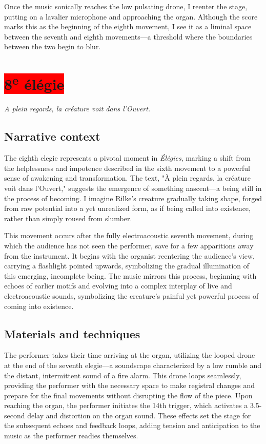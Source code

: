 \documentclass[12pt,twoside,maitrise]{dms_ks}
\theoremstyle{definition}
\begin{document}
{Once the music sonically reaches the low pulsating drone, I reenter the stage, putting on a lavalier microphone and approaching the organ. 
Although the score marks this as the beginning of the eighth movement, I see it as a liminal space between the seventh and eighth movements—a threshold where the boundaries between the two begin to blur.

\section{\colorbox{red}{8\textsuperscript{e} élégie}}

\epigraph{\textit{A plein regards, la créature voit dans l’Ouvert.}}{}

\subsection{Narrative context}

The eighth elegie represents a pivotal moment in \textit{Élégies}, marking a shift from the helplessness and impotence described in the sixth movement to a powerful sense of awakening and transformation. 
The text, "À plein regards, la créature voit dans l’Ouvert," suggests the emergence of something nascent—a being still in the process of becoming. 
I imagine Rilke's creature gradually taking shape, forged from raw potential into a yet unrealized form, as if being called into existence, rather than simply roused from slumber.

This movement occurs after the fully electroacoustic seventh movement, during which the audience has not seen the performer, save for a few apparitions away from the instrument. 
It begins with the organist reentering the audience's view, carrying a flashlight pointed upwards, symbolizing the gradual illumination of this emerging, incomplete being. 
The music mirrors this process, beginning with echoes of earlier motifs and evolving into a complex interplay of live and electroacoustic sounds, symbolizing the creature’s painful yet powerful process of coming into existence.

\subsection{Materials and techniques}

The performer takes their time arriving at the organ, utilizing the looped drone at the end of the seventh elegie—a soundscape characterized by a low rumble and the distant, intermittent sound of a fire alarm. 
This drone loops seamlessly, providing the performer with the necessary space to make registral changes and prepare for the final movements without disrupting the flow of the piece. 
Upon reaching the organ, the performer initiates the 14th trigger, which activates a 3.5-second delay and distortion on the organ sound. 
These effects set the stage for the subsequent echoes and feedback loops, adding tension and anticipation to the music as the performer readies themselves.

}
\end{document}
